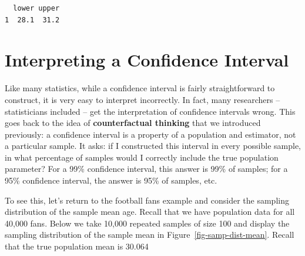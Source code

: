 \documentclass[
  letterpaper,
  DIV=11,
  numbers=noendperiod]{scrreprt}
\theoremstyle{definition}
\theoremstyle{remark}
\begin{document}
\begin{verbatim}
  lower upper
1  28.1  31.2
\end{verbatim}

\hypertarget{interpreting-a-confidence-interval}{%
\section{Interpreting a Confidence
Interval}\label{interpreting-a-confidence-interval}}

Like many statistics, while a confidence interval is fairly
straightforward to construct, it is very easy to interpret incorrectly.
In fact, many researchers -- statisticians included -- get the
interpretation of confidence intervals wrong. This goes back to the idea
of \textbf{counterfactual thinking} that we introduced previously: a
confidence interval is a property of a population and estimator, not a
particular sample. It asks: if I constructed this interval in every
possible sample, in what percentage of samples would I correctly include
the true population parameter? For a 99\% confidence interval, this
answer is 99\% of samples; for a 95\% confidence interval, the answer is
95\% of samples, etc.

To see this, let's return to the football fans example and consider the
sampling distribution of the sample mean age. Recall that we have
population data for all 40,000 fans. Below we take 10,000 repeated
samples of size 100 and display the sampling distribution of the sample
mean in Figure~\ref{fig-samp-dist-mean}. Recall that the true population
mean is 30.064
\end{document}
